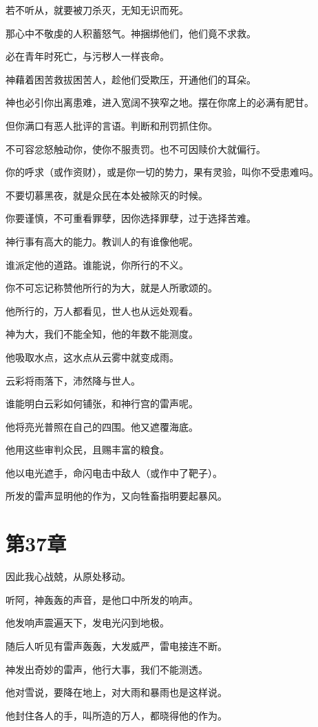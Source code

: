 \documentclass[12pt,oneside]{book}
\begin{document}
若不听从，就要被刀杀灭，无知无识而死。

那心中不敬虔的人积蓄怒气。神捆绑他们，他们竟不求救。

必在青年时死亡，与污秽人一样丧命。

神藉着困苦救拔困苦人，趁他们受欺压，开通他们的耳朵。

神也必引你出离患难，进入宽阔不狭窄之地。摆在你席上的必满有肥甘。

但你满口有恶人批评的言语。判断和刑罚抓住你。

不可容忿怒触动你，使你不服责罚。也不可因赎价大就偏行。

你的呼求（或作资财），或是你一切的势力，果有灵验，叫你不受患难吗。

不要切慕黑夜，就是众民在本处被除灭的时候。

你要谨慎，不可重看罪孽，因你选择罪孽，过于选择苦难。

神行事有高大的能力。教训人的有谁像他呢。

谁派定他的道路。谁能说，你所行的不义。

你不可忘记称赞他所行的为大，就是人所歌颂的。

他所行的，万人都看见，世人也从远处观看。

神为大，我们不能全知，他的年数不能测度。

他吸取水点，这水点从云雾中就变成雨。

云彩将雨落下，沛然降与世人。

谁能明白云彩如何铺张，和神行宫的雷声呢。

他将亮光普照在自己的四围。他又遮覆海底。

他用这些审判众民，且赐丰富的粮食。

他以电光遮手，命闪电击中敌人（或作中了靶子）。

所发的雷声显明他的作为，又向牲畜指明要起暴风。


\chapter{第37章}
因此我心战兢，从原处移动。

听阿，神轰轰的声音，是他口中所发的响声。

他发响声震遍天下，发电光闪到地极。

随后人听见有雷声轰轰，大发威严，雷电接连不断。

神发出奇妙的雷声，他行大事，我们不能测透。

他对雪说，要降在地上，对大雨和暴雨也是这样说。

他封住各人的手，叫所造的万人，都晓得他的作为。
\end{document}
